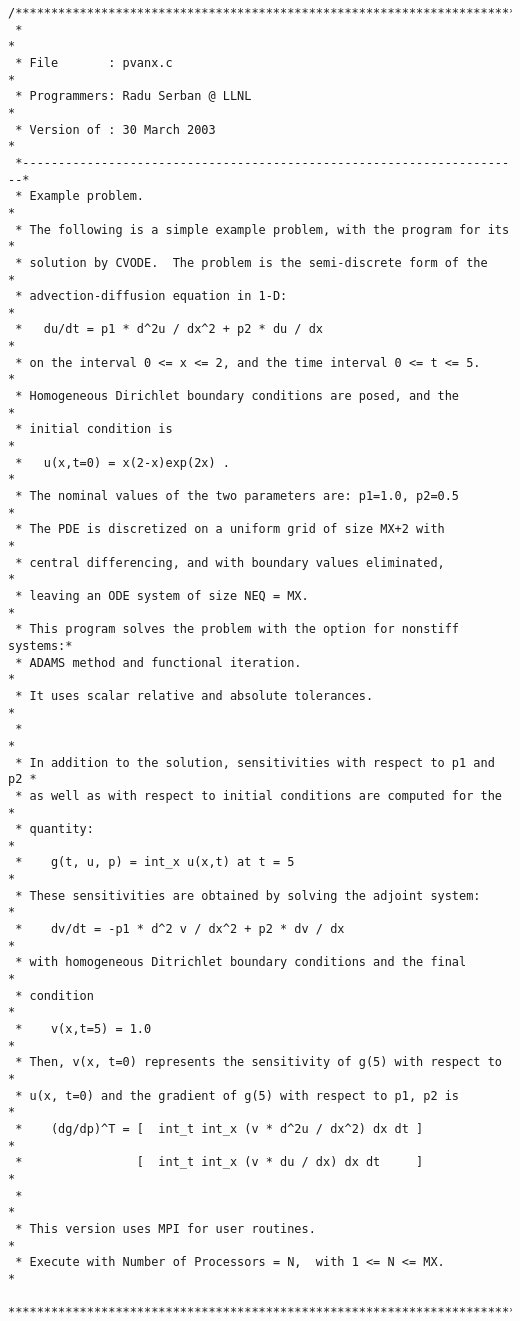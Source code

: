 \begin{verbatim}
/************************************************************************
 *                                                                      *
 * File       : pvanx.c                                                 *
 * Programmers: Radu Serban @ LLNL                                      *
 * Version of : 30 March 2003                                           *
 *----------------------------------------------------------------------*
 * Example problem.                                                     *
 * The following is a simple example problem, with the program for its  *
 * solution by CVODE.  The problem is the semi-discrete form of the     *
 * advection-diffusion equation in 1-D:                                 *
 *   du/dt = p1 * d^2u / dx^2 + p2 * du / dx                            *
 * on the interval 0 <= x <= 2, and the time interval 0 <= t <= 5.      *
 * Homogeneous Dirichlet boundary conditions are posed, and the         *
 * initial condition is                                                 *
 *   u(x,t=0) = x(2-x)exp(2x) .                                         *
 * The nominal values of the two parameters are: p1=1.0, p2=0.5         *
 * The PDE is discretized on a uniform grid of size MX+2 with           *
 * central differencing, and with boundary values eliminated,           *
 * leaving an ODE system of size NEQ = MX.                              *
 * This program solves the problem with the option for nonstiff systems:*
 * ADAMS method and functional iteration.                               *
 * It uses scalar relative and absolute tolerances.                     *
 *                                                                      *
 * In addition to the solution, sensitivities with respect to p1 and p2 *
 * as well as with respect to initial conditions are computed for the   *
 * quantity:                                                            *
 *    g(t, u, p) = int_x u(x,t) at t = 5                                *
 * These sensitivities are obtained by solving the adjoint system:      *
 *    dv/dt = -p1 * d^2 v / dx^2 + p2 * dv / dx                         *
 * with homogeneous Ditrichlet boundary conditions and the final        *
 * condition                                                            *
 *    v(x,t=5) = 1.0                                                    *
 * Then, v(x, t=0) represents the sensitivity of g(5) with respect to   *
 * u(x, t=0) and the gradient of g(5) with respect to p1, p2 is         *
 *    (dg/dp)^T = [  int_t int_x (v * d^2u / dx^2) dx dt ]              *
 *                [  int_t int_x (v * du / dx) dx dt     ]              *
 *                                                                      *
 * This version uses MPI for user routines.                             *
 * Execute with Number of Processors = N,  with 1 <= N <= MX.           *
 ************************************************************************/


\end{verbatim}
